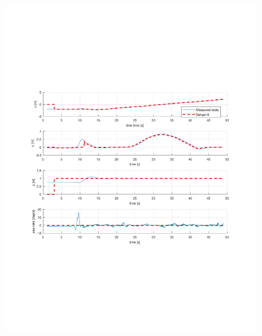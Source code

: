 \documentclass[numbered,pdftex]{ohio-etd}
\begin{document}
\begin{figure}[H]
	\centering
	\includegraphics[trim = 65 200 0 200, clip, width=17cm]{Figures/results/compareFigures/3Controller}
	\caption{}
	\label{fig:3Controller}
\end{figure}
\end{document}
